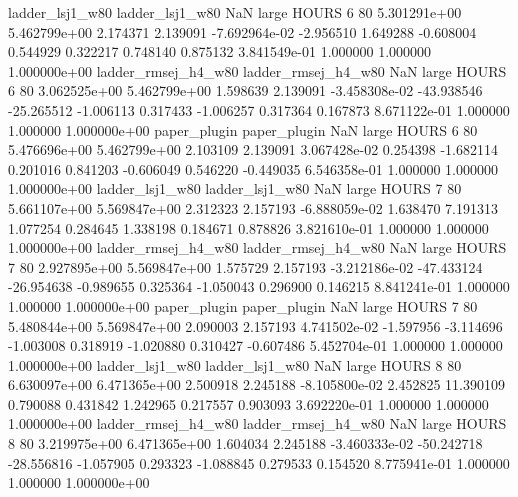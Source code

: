     ladder_lsj1_w80     ladder_lsj1_w80                   NaN      large    HOURS                 6 80 5.301291e+00   5.462799e+00      2.174371       2.139091 -7.692964e-02     -2.956510      1.649288    -0.608004       0.544929  0.322217   0.748140     0.875132   3.841549e-01            1.000000        1.000000        1.000000e+00
ladder_rmsej_h4_w80 ladder_rmsej_h4_w80                   NaN      large    HOURS                 6 80 3.062525e+00   5.462799e+00      1.598639       2.139091 -3.458308e-02    -43.938546    -25.265512    -1.006113       0.317433 -1.006257   0.317364     0.167873   8.671122e-01            1.000000        1.000000        1.000000e+00
       paper_plugin        paper_plugin                   NaN      large    HOURS                 6 80 5.476696e+00   5.462799e+00      2.103109       2.139091  3.067428e-02      0.254398     -1.682114     0.201016       0.841203 -0.606049   0.546220    -0.449035   6.546358e-01            1.000000        1.000000        1.000000e+00
    ladder_lsj1_w80     ladder_lsj1_w80                   NaN      large    HOURS                 7 80 5.661107e+00   5.569847e+00      2.312323       2.157193 -6.888059e-02      1.638470      7.191313     1.077254       0.284645  1.338198   0.184671     0.878826   3.821610e-01            1.000000        1.000000        1.000000e+00
ladder_rmsej_h4_w80 ladder_rmsej_h4_w80                   NaN      large    HOURS                 7 80 2.927895e+00   5.569847e+00      1.575729       2.157193 -3.212186e-02    -47.433124    -26.954638    -0.989655       0.325364 -1.050043   0.296900     0.146215   8.841241e-01            1.000000        1.000000        1.000000e+00
       paper_plugin        paper_plugin                   NaN      large    HOURS                 7 80 5.480844e+00   5.569847e+00      2.090003       2.157193  4.741502e-02     -1.597956     -3.114696    -1.003008       0.318919 -1.020880   0.310427    -0.607486   5.452704e-01            1.000000        1.000000        1.000000e+00
    ladder_lsj1_w80     ladder_lsj1_w80                   NaN      large    HOURS                 8 80 6.630097e+00   6.471365e+00      2.500918       2.245188 -8.105800e-02      2.452825     11.390109     0.790088       0.431842  1.242965   0.217557     0.903093   3.692220e-01            1.000000        1.000000        1.000000e+00
ladder_rmsej_h4_w80 ladder_rmsej_h4_w80                   NaN      large    HOURS                 8 80 3.219975e+00   6.471365e+00      1.604034       2.245188 -3.460333e-02    -50.242718    -28.556816    -1.057905       0.293323 -1.088845   0.279533     0.154520   8.775941e-01            1.000000        1.000000        1.000000e+00
